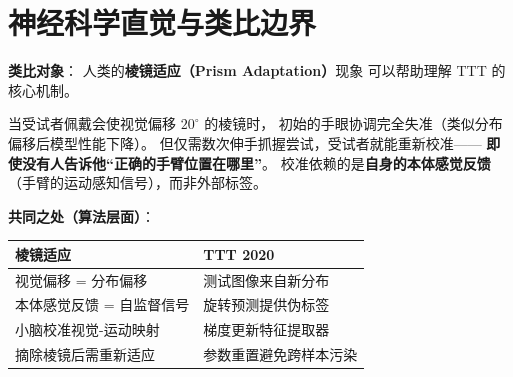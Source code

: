 \section{神经科学直觉与类比边界}
\label{sec:ttt_neuro}

\begin{neurosciencebox}[title=神经科学直觉：感觉-运动的在线校准]

\textbf{类比对象}：
人类的\textbf{棱镜适应（Prism Adaptation）}现象
可以帮助理解 TTT 的核心机制。

当受试者佩戴会使视觉偏移 $20^\circ$ 的棱镜时，
初始的手眼协调完全失准（类似分布偏移后模型性能下降）。
但仅需数次伸手抓握尝试，受试者就能重新校准——
\textbf{即使没有人告诉他``正确的手臂位置在哪里''}。
校准依赖的是\textbf{自身的本体感觉反馈}
（手臂的运动感知信号），而非外部标签。

\textbf{共同之处（算法层面）}：
\begin{center}
\begin{tabular}{p{5cm} p{5cm}}
\toprule
\textbf{棱镜适应} & \textbf{TTT 2020} \\
\midrule
视觉偏移 = 分布偏移 & 测试图像来自新分布 \\
本体感觉反馈 = 自监督信号 & 旋转预测提供伪标签 \\
小脑校准视觉-运动映射 & 梯度更新特征提取器 \\
摘除棱镜后需重新适应 & 参数重置避免跨样本污染 \\
\bottomrule
\end{tabular}
\end{center}

\end{neurosciencebox}

